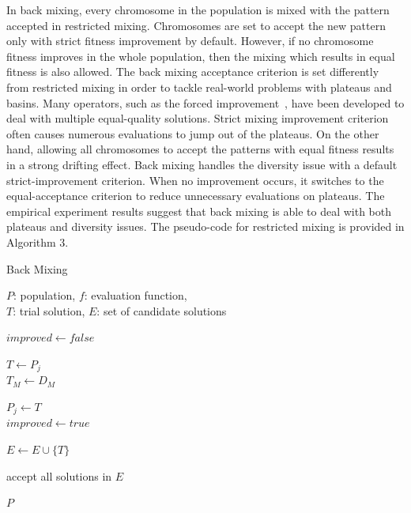 \documentclass{sig-alternate-05-2015}
\begin{document}
In back mixing, every chromosome in the population is mixed with the pattern accepted in restricted mixing. Chromosomes are set to accept the new pattern only with strict fitness improvement by default. However, if no chromosome fitness improves in the whole population, then the mixing which results in equal fitness is also allowed. The back mixing acceptance criterion is set differently from restricted mixing in order to tackle real-world problems with plateaus and basins. Many operators, such as the forced improvement~\cite{bosman:LT-GOMEA}, have been developed to deal with multiple equal-quality solutions. Strict mixing improvement criterion often causes numerous evaluations to jump out of the plateaus. On the other hand, allowing all chromosomes to accept the patterns with equal fitness results in a strong drifting effect. Back mixing handles the diversity issue with a default strict-improvement criterion. When no improvement occurs, it switches to the equal-acceptance criterion to reduce unnecessary evaluations on plateaus. The empirical experiment results suggest that back mixing is able to deal with both plateaus and diversity issues. The pseudo-code for  restricted mixing is provided in Algorithm 3. 

\begin{algorithm}
\caption{Back Mixing}\label{algo_disjdecomp}

$P$: population, $f$: evaluation function, \\
$T$: trial solution, $E$: set of candidate solutions 


\BlankLine

$improved  \leftarrow false$ \\
 {

    $T \leftarrow P_j$ \\
    $T_M \leftarrow D_M$ \\

     {

        $P_j \leftarrow T$ \\
        $improved  \leftarrow true$ \\
    }{
         {
            $E \leftarrow E \cup \{T\}$ \\
        }
    }
}
 {
    accept all solutions in $E$ \\
} 

\Return $P$

\end{algorithm} 
\end{document}

